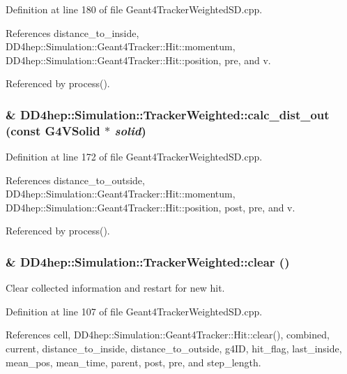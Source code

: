 Definition at line 180 of file Geant4TrackerWeightedSD.cpp.

References distance\_\-to\_\-inside, DD4hep::Simulation::Geant4Tracker::Hit::momentum, DD4hep::Simulation::Geant4Tracker::Hit::position, pre, and v.

Referenced by process().\hypertarget{struct_d_d4hep_1_1_simulation_1_1_tracker_weighted_ac7628c08fbf29a1dc2133ac7b30e1499}{
\subsubsection[{calc\_\-dist\_\-out}]{\& DD4hep::Simulation::TrackerWeighted::calc\_\-dist\_\-out (const G4VSolid $\ast$ {\em solid})}}
\label{struct_d_d4hep_1_1_simulation_1_1_tracker_weighted_ac7628c08fbf29a1dc2133ac7b30e1499}


Definition at line 172 of file Geant4TrackerWeightedSD.cpp.

References distance\_\-to\_\-outside, DD4hep::Simulation::Geant4Tracker::Hit::momentum, DD4hep::Simulation::Geant4Tracker::Hit::position, post, pre, and v.

Referenced by process().\hypertarget{struct_d_d4hep_1_1_simulation_1_1_tracker_weighted_a0c6304d5c3a6b0964f7388c3440235db}{
\subsubsection[{clear}]{\& DD4hep::Simulation::TrackerWeighted::clear ()}}
\label{struct_d_d4hep_1_1_simulation_1_1_tracker_weighted_a0c6304d5c3a6b0964f7388c3440235db}


Clear collected information and restart for new hit. 

Definition at line 107 of file Geant4TrackerWeightedSD.cpp.

References cell, DD4hep::Simulation::Geant4Tracker::Hit::clear(), combined, current, distance\_\-to\_\-inside, distance\_\-to\_\-outside, g4ID, hit\_\-flag, last\_\-inside, mean\_\-pos, mean\_\-time, parent, post, pre, and step\_\-length.

